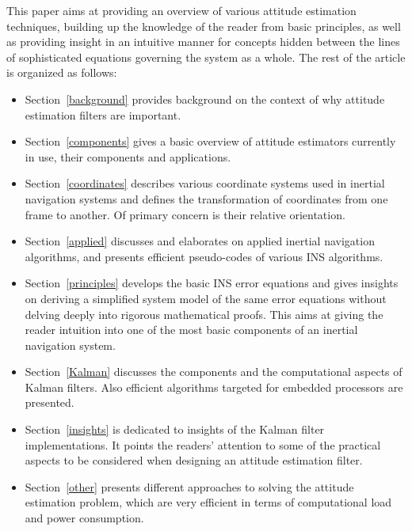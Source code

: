 \documentclass[journal]{IEEEtran}
\begin{document}
This paper aims at providing an overview of various attitude estimation techniques, building up the knowledge of the reader from basic principles, as well as providing  insight in an intuitive manner for concepts hidden between the lines of sophisticated equations governing the system as a whole. The rest of the article is organized as follows:
\begin{itemize}[label={\tiny\raisebox{1ex}{\textbullet}}, leftmargin=*]
\item Section~\ref{background} provides background on the context of why attitude estimation filters are important.
\item Section~\ref{components} gives a basic overview of attitude  estimators currently in use, their components and applications.
\item Section~\ref{coordinates} describes various coordinate systems used in inertial navigation systems and defines the transformation of coordinates from one frame to another. Of primary concern is their relative orientation.
\item Section~\ref{applied} discusses and elaborates on applied inertial navigation algorithms, and presents efficient pseudo-codes of various INS algorithms.
\item Section~\ref{principles} develops the basic INS error equations and gives insights on deriving a simplified system model of the same error equations without delving deeply into rigorous mathematical proofs. This aims at giving the reader intuition into one of the most basic components of an inertial navigation system. 
\item Section~\ref{Kalman} discusses the components and the computational aspects of Kalman filters. Also efficient algorithms targeted for embedded processors are presented. 
\item Section~\ref{insights} is dedicated to insights of the Kalman filter implementations. It points the  readers' attention to some of the practical aspects to be considered when designing an attitude estimation filter.
\item Section~\ref{other} presents different approaches to solving the attitude estimation problem, which are very efficient in terms of computational load and power consumption.
\end{itemize}  







\end{document}
